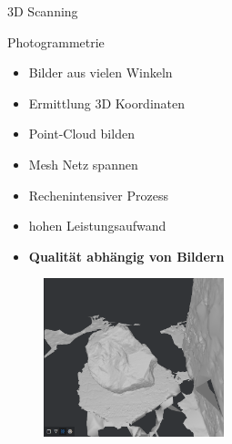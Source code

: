 \begin{frame}{3D Scanning}
    
    \begin{minipage}[m]{.49\textwidth}
    \begin{block}{Photogrammetrie}
        \begin{itemize}
            \item Bilder aus vielen Winkeln
            \item Ermittlung 3D Koordinaten
            \item Point-Cloud bilden
            \item Mesh Netz spannen
            \item Rechenintensiver Prozess
            \item hohen Leistungsaufwand
            \item \textbf{Qualität abhängig von Bildern}
        \end{itemize}   
    \end{block}
    \end{minipage}
    \begin{minipage}[m]{.49\textwidth}
        \begin{figure}[]
          \includegraphics[height=130pt]{img_niklas/rock_3dscan.PNG}
          \label{fig:my_label}
      \end{figure}    
    \end{minipage}
    
\end{frame}

